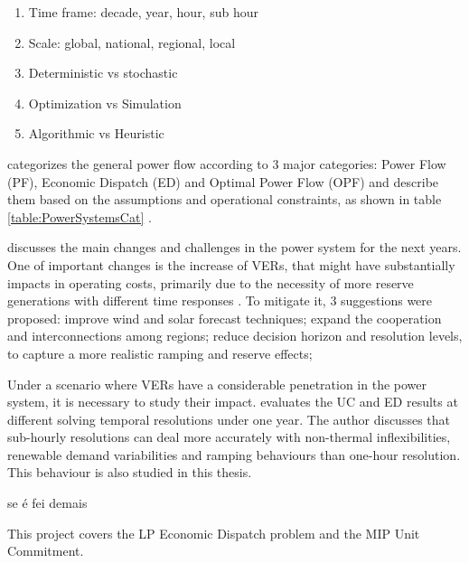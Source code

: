 \documentclass[12pt,LUDisStyle,twosided]{book}
\begin{document}
\begin{enumerate}
\item Time frame: decade, year, hour, sub hour 
\item Scale: global, national, regional, local
\item Deterministic vs stochastic
\item Optimization vs Simulation
\item Algorithmic vs Heuristic
\end{enumerate}

\citeauthor{cain} categorizes the general power flow according to 3 major categories: Power Flow (PF), Economic Dispatch (ED) and Optimal Power Flow (OPF) and describe them based on the assumptions and operational constraints, as shown in table \ref{table:PowerSystemsCat} \cite{cain}.

\citeauthor{kassakian} discusses the main changes and challenges in the power system for the next years. One of important changes is the increase of VERs, that might have substantially impacts in operating costs, primarily due to the necessity of more reserve generations with different time responses \cite{kassakian}. To mitigate it, 3 suggestions were proposed: improve wind and solar forecast techniques; expand the cooperation and interconnections among regions; reduce decision horizon and resolution levels, to capture a more realistic ramping and reserve effects;


Under a scenario where VERs have a considerable penetration in the power system, it is necessary to study their impact. \citeauthor{deane} evaluates the UC and ED results at different solving temporal resolutions under one year. The author discusses that sub-hourly resolutions can deal more accurately with non-thermal inflexibilities, renewable demand variabilities and ramping behaviours than one-hour resolution. This behaviour is also studied in this thesis.

\citeauthor{safaei} se é fei demais \cite{safaei}

This project covers the LP Economic Dispatch problem and the MIP Unit Commitment.
\end{document}
